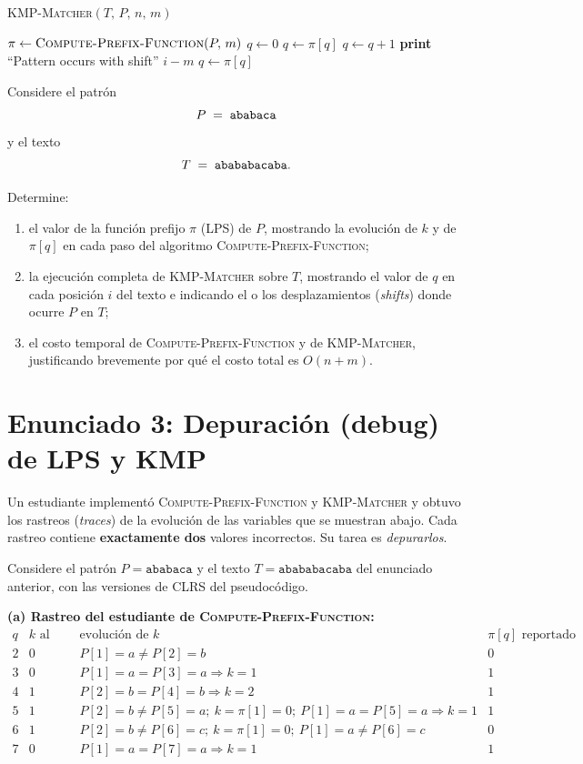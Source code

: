 \documentclass[11pt]{article}
\begin{document}
\noindent\textsc{KMP-Matcher}$(T,\,P,\,n,\,m)$
\begin{algorithmic}[1]
\State $\pi \gets \textsc{Compute-Prefix-Function}(P,\,m)$
\State $q \gets 0$
    \State $q \gets \pi[q]$
  \EndWhile
    \State $q \gets q + 1$
  \EndIf
    \State \textbf{print} ``Pattern occurs with shift'' $i - m$
    \State $q \gets \pi[q]$
  \EndIf
\EndFor
\end{algorithmic}

Considere el patrón
\[
P \;=\; \text{\texttt{ababaca}}
\]
y el texto
\[
T \;=\; \text{\texttt{abababacaba}}.
\]

Determine:
\begin{enumerate}[label=(\alph*),itemsep=0.25em]
  \item el valor de la función prefijo \(\pi\) (LPS) de \(P\), mostrando la evolución de \(k\) y de \(\pi[q]\) en cada paso del algoritmo \textsc{Compute-Prefix-Function};
  \item la ejecución completa de \textsc{KMP-Matcher} sobre \(T\), mostrando el valor de \(q\) en cada posición \(i\) del texto e indicando el o los desplazamientos (\emph{shifts}) donde ocurre \(P\) en \(T\);
  \item el costo temporal de \textsc{Compute-Prefix-Function} y de \textsc{KMP-Matcher}, justificando brevemente por qué el costo total es \(O(n+m)\).
\end{enumerate}

\clearpage

\section*{Enunciado 3: Depuración (debug) de LPS y KMP}

Un estudiante implementó \textsc{Compute-Prefix-Function} y \textsc{KMP-Matcher} y obtuvo los rastreos (\emph{traces}) de la evolución de las variables que se muestran abajo. Cada rastreo contiene \textbf{exactamente dos} valores incorrectos. Su tarea es \emph{depurarlos}.

Considere el patrón \(P=\texttt{ababaca}\) y el texto \(T=\texttt{abababacaba}\) del enunciado anterior, con las versiones de CLRS del pseudocódigo.

\textbf{(a) Rastreo del estudiante de \textsc{Compute-Prefix-Function}:}
\[
\begin{array}{c|c|c|c}
q & k \text{ al inicio} & \text{evolución de } k & \pi[q] \text{ reportado}\\\hline
2 & 0 & P[1]{=}a \neq P[2]{=}b & 0\\
3 & 0 & P[1]{=}a = P[3]{=}a \Rightarrow k=1 & 1\\
4 & 1 & P[2]{=}b = P[4]{=}b \Rightarrow k=2 & 1\\
5 & 1 & P[2]{=}b \neq P[5]{=}a;\ k=\pi[1]=0;\ P[1]{=}a = P[5]{=}a \Rightarrow k=1 & 1\\
6 & 1 & P[2]{=}b \neq P[6]{=}c;\ k=\pi[1]=0;\ P[1]{=}a \neq P[6]{=}c & 0\\
7 & 0 & P[1]{=}a = P[7]{=}a \Rightarrow k=1 & 1
\end{array}
\]
\end{document}
